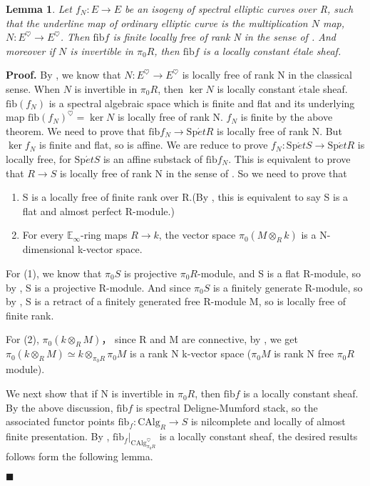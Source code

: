 \documentclass[12pt]{article}
\newtheorem{lemma}[theorem]{Lemma}
\theoremstyle{thry}
\renewenvironment{proof}
{\par \noindent \textbf{Proof.}}
{ \par \hfill $\blacksquare$ \quad \par }
\def  \CAlg     {\mathrm{CAlg}}
\def  \etale    {\acute{e}\text{tale}}
\def  \fib      {\mathrm{fib}}
\def  \Spet     {\mathrm{Sp}\acute{e}t}
\def  \be       {\mathbb{E}}
\begin{document}
 
\begin{lemma} \label{locally constant}
	Let $f_N: E \to E$ be an isogeny of spectral elliptic  curves over R,  such that the underline map of ordinary elliptic curve is the multiplication $N$ map, $N: E^{\heartsuit} \to E^{\heartsuit}$.  Then $\fib f$ is  finite locally free of rank N in the sense of \cite[Definition 5.2.3.1]{lu-SAG}. And moreover if $N$ is invertible in  $\pi_0 R$, then $\fib f$ is a locally constant \'etale sheaf.
\end{lemma}

\begin{proof}
	By \cite[Theorem 2.3.1]{katz1985arithmetic}, we know that $N: E^{\heartsuit} \to E^{\heartsuit}$ is locally free of rank N in the classical sense. When $N$ is invertible in $ \pi_0 R$, then $\ker N$ is locally constant $\etale$ sheaf.  $\fib(f_N)$ is a spectral algebraic space which is  finite and flat and its underlying map $\fib(f_N)^{\heartsuit} = \ker N$ is  locally free of rank N. $f_N$ is finite by the above theorem. We need to  prove that  $ \fib f_N  \to \Spet R$ is  locally free of rank N.  But $\ker f_N$ is finite and  flat, so is affine. We are reduce to  prove $f_N: \Spet S \to \Spet R$  is locally free, for $\Spet S$ is an affine substack of $\fib f _N$.   This is equivalent  to prove that  $R \to S$ is locally free  of rank N in the sense of \cite[Definition 2.9.2.1]{lu-SAG}.  So we need to prove that
	\begin{enumerate}
		\item  S is a  locally free of finite rank over R.(By \cite[Proposition 7.2.4.20]{lu-HA}, this is equivalent to say S is a flat and almost perfect R-module.)
		\item  For every $\be_{\infty}$-ring  maps $R \to k$, the vector space $\pi_0 (M \otimes_R k)$ is a N-dimensional k-vector space.
	\end{enumerate}
	
	 For (1), we know that $\pi_0 S$ is projective  $\pi_0 R$-module, and  S is a flat R-module, so by \cite[Proposition 7.2.2.18]{lu-HTT}, S is a projective R-module.  And since $\pi_0 S$ is a finitely generate R-module, so by \cite[Corollary 7.2.2.9]{lu-HA}, S is a retract of a finitely generated free R-module M, so is locally free of finite rank.
	 
	 For (2), $\pi_0 (k \otimes_R M)$， since R and M are connective, by \cite[Corollary 7.2.1.23]{lu-HA}, we get $\pi_0(k \otimes_R M) \simeq k \otimes_{\pi_0 R} \pi_0 M $ is a rank N k-vector space ($\pi_0 M$ is rank N  free $\pi_0 R$ module).
	 
	 We next show that if N is invertible in $\pi_0 R$, then $\fib f$ is a locally constant sheaf.  By the above discussion, $\fib f$ is spectral Deligne-Mumford stack,  so the associated functor points $\fib_f: \CAlg_R  \to S$ is nilcomplete and locally of almost finite presentation.  	By \cite[Theorem 2.3.1]{katz1985arithmetic}, $\fib_f|_{\CAlg_{\pi_0 R}^{\heartsuit}}$  is a locally constant sheaf,  the desired results follows form the following lemma. 
\end{proof}
\end{document}
